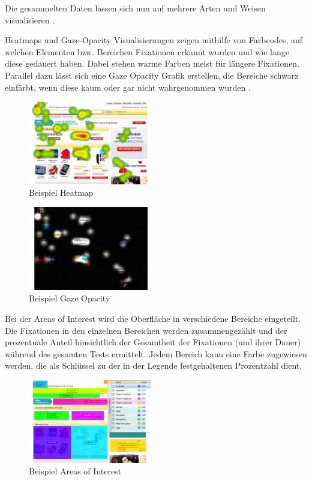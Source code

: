 Die gesammelten Daten lassen sich nun auf mehrere Arten und Weisen visualisieren \cite{Henrici2010}.\par
Heatmaps und Gaze-Opacity Visualisierungen  zeigen mithilfe von Farbcodes, auf welchen Elementen bzw. Bereichen Fixationen erkannt wurden und wie lange diese gedauert haben. Dabei stehen warme Farben meist für längere Fixationen. Parallel dazu lässt sich eine Gaze Opacity Grafik erstellen, die Bereiche schwarz einfärbt, wenn diese kaum oder gar nicht wahrgenommen wurden \cite{Henrici2010}.
\begin{figure}[H]
 \centering
 \includegraphics[width=0.48\textwidth]{grafiken/heatmap.png}
 \caption{Beispiel Heatmap \cite{Henrici2010}}
 \label{fig:heatmap}
\end{figure}
\begin{figure}[H]
 \centering
 \includegraphics[width=0.48\textwidth]{grafiken/gaze_opacity.png}
 \caption{Beispiel Gaze Opacity \cite{Henrici2010}}
 \label{fig:gazeOpacity}
\end{figure}
Bei der Areas of Interest wird die Oberfläche in verschiedene Bereiche eingeteilt. Die Fixationen in den einzelnen Bereichen werden zusammengezählt und der prozentuale Anteil hinsichtlich der Gesamtheit der Fixationen (und ihrer Dauer) während des gesamten Tests ermittelt. Jedem Bereich kann eine Farbe zugewiesen werden, die als Schlüssel zu der in der Legende festgehaltenen Prozentzahl dient.
\begin{figure}[H]
 \centering
 \includegraphics[width=0.48\textwidth]{grafiken/areas_of_interest.png}
 \caption{Beispiel Areas of Interest \cite{Henrici2010}}
 \label{fig:areasOfInterest}
\end{figure}
